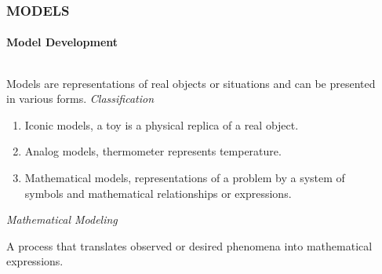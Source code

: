 \documentclass[14 pt]{beamer}
\begin{document}

\begin{frame}[t]
\frametitle{MODELS}
\framesubtitle{Model Development}

\begin{columns}[t]
\begin{column}{0.45\textwidth}
Models are representations of real objects or situations and can be presented in various forms.
\vskip0.5cm%
\emph{Classification}

\begin{enumerate}
  \item Iconic models, a toy is a physical replica of a real object. 
  \item Analog models, thermometer represents temperature.
  \item Mathematical models, representations of a problem by a system of symbols and mathematical relationships or expressions.
\end{enumerate}
\vskip0.5cm%
\emph{Mathematical Modeling}

A process that translates observed or desired phenomena into mathematical expressions.
\end{column}

\begin{column}{0.45\textwidth}

\end{column}
\end{columns}
\end{frame}

\end{document}

